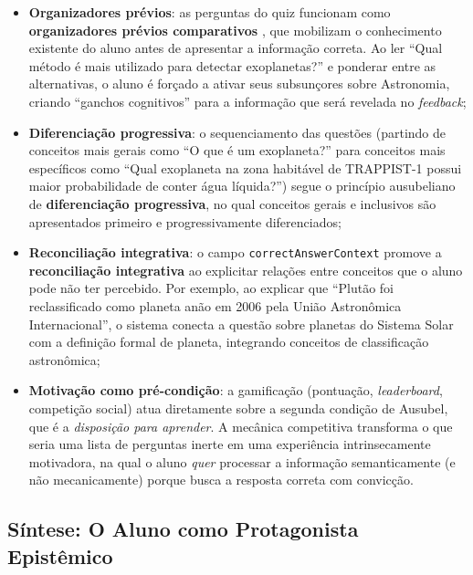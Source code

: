 \documentclass[
	12pt,
	openany,
	oneside,
	a4paper,
	english,
	brazil
]{abntex2}
\begin{document}
\begin{itemize}
  \item \textbf{Organizadores prévios}: as perguntas do quiz funcionam como \textbf{organizadores prévios comparativos} \cite{ausubel1968}, que mobilizam o conhecimento existente do aluno antes de apresentar a informação correta. Ao ler ``Qual método é mais utilizado para detectar exoplanetas?'' e ponderar entre as alternativas, o aluno é forçado a ativar seus subsunçores sobre Astronomia, criando ``ganchos cognitivos'' para a informação que será revelada no \textit{feedback};
 
  \item \textbf{Diferenciação progressiva}: o sequenciamento das questões (partindo de conceitos mais gerais como ``O que é um exoplaneta?'' para conceitos mais específicos como ``Qual exoplaneta na zona habitável de TRAPPIST-1 possui maior probabilidade de conter água líquida?'') segue o princípio ausubeliano de \textbf{diferenciação progressiva}, no qual conceitos gerais e inclusivos são apresentados primeiro e progressivamente diferenciados;
 
  \item \textbf{Reconciliação integrativa}: o campo \texttt{correctAnswerContext} promove a \textbf{reconciliação integrativa} ao explicitar relações entre conceitos que o aluno pode não ter percebido. Por exemplo, ao explicar que ``Plutão foi reclassificado como planeta anão em 2006 pela União Astronômica Internacional'', o sistema conecta a questão sobre planetas do Sistema Solar com a definição formal de planeta, integrando conceitos de classificação astronômica;
 
  \item \textbf{Motivação como pré-condição}: a gamificação (pontuação, \textit{leaderboard}, competição social) atua diretamente sobre a segunda condição de Ausubel, que é a \textit{disposição para aprender}. A mecânica competitiva transforma o que seria uma lista de perguntas inerte em uma experiência intrinsecamente motivadora, na qual o aluno \textit{quer} processar a informação semanticamente (e não mecanicamente) porque busca a resposta correta com convicção.
\end{itemize}
 
\subsection{Síntese: O Aluno como Protagonista Epistêmico}
 

\postextual
\end{document}
